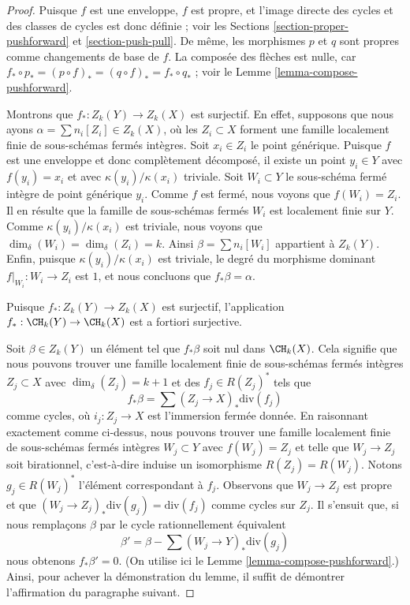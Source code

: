 \begin{proof}
Puisque $f$ est une enveloppe, $f$ est propre, et l'image directe des
cycles et des classes de cycles est donc définie ; voir les
Sections \ref{section-proper-pushforward} et \ref{section-push-pull}.
De même, les morphismes $p$ et $q$ sont propres comme changements de base de $f$.
La composée des flèches est nulle, car
$f_* \circ p_* = (p \circ f)_* = (q \circ f)_* = f_* \circ q_*$ ; voir le
Lemme \ref{lemma-compose-pushforward}.

\medskip\noindent
Montrons que $f_* : Z_k(Y) \to Z_k(X)$ est surjectif.
En effet, supposons que nous ayons $\alpha = \sum n_i[Z_i] \in Z_k(X)$,
où les $Z_i \subset X$ forment une famille localement finie de sous-schémas
fermés intègres. Soit $x_i \in Z_i$ le point générique.
Puisque $f$ est une enveloppe et donc complètement décomposé,
il existe un point $y_i \in Y$ avec $f(y_i) = x_i$
et avec $\kappa(y_i)/\kappa(x_i)$ triviale. Soit $W_i \subset Y$
le sous-schéma fermé intègre de point générique $y_i$.
Comme $f$ est fermé, nous voyons que $f(W_i) = Z_i$.
Il en résulte que la famille de sous-schémas fermés $W_i$ est localement finie
sur $Y$. Comme $\kappa(y_i)/\kappa(x_i)$ est triviale, nous voyons
que $\dim_\delta(W_i) = \dim_\delta(Z_i) = k$. Ainsi
$\beta = \sum n_i[W_i]$ appartient à $Z_k(Y)$. Enfin, puisque
$\kappa(y_i)/\kappa(x_i)$ est triviale, le degré du morphisme dominant
$f|_{W_i} : W_i \to Z_i$ est $1$, et nous concluons
que $f_*\beta = \alpha$.

\medskip\noindent
Puisque $f_* : Z_k(Y) \to Z_k(X)$ est surjectif, l'application
$f_* : \CH_k(Y) \to \CH_k(X)$ est a fortiori surjective.

\medskip\noindent
Soit $\beta \in Z_k(Y)$ un élément tel que $f_*\beta$ soit nul dans
$\CH_k(X)$. Cela signifie que nous pouvons trouver une famille localement finie de
sous-schémas fermés intègres $Z_j \subset X$ avec $\dim_\delta(Z_j) = k + 1$
et des $f_j \in R(Z_j)^*$ tels que
$$
f_*\beta = \sum (Z_j \to X)_*\text{div}(f_j)
$$
comme cycles, où $i_j : Z_j \to X$ est l'immersion fermée donnée.
En raisonnant exactement comme ci-dessus, nous pouvons trouver une famille
localement finie de sous-schémas fermés intègres $W_j \subset Y$
avec $f(W_j) = Z_j$ et telle que $W_j \to Z_j$ soit birationnel, c'est-à-dire
induise un isomorphisme $R(Z_j) = R(W_j)$. Notons $g_j \in R(W_j)^*$
l'élément correspondant à $f_j$. Observons que $W_j \to Z_j$
est propre et que $(W_j \to Z_j)_*\text{div}(g_j) = \text{div}(f_j)$
comme cycles sur $Z_j$. Il s'ensuit que, si nous remplaçons
$\beta$ par le cycle rationnellement équivalent
$$
\beta' = \beta - \sum (W_j \to Y)_*\text{div}(g_j)
$$
nous obtenons $f_*\beta' = 0$.
(On utilise ici le Lemme \ref{lemma-compose-pushforward}.)
Ainsi, pour achever la démonstration
du lemme, il suffit de démontrer l'affirmation du paragraphe suivant.


\end{proof}
